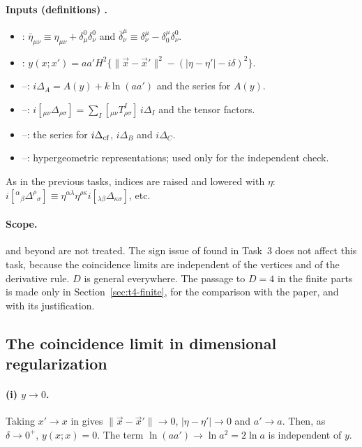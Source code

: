 \paragraph{Inputs (definitions) \tP.}
\begin{itemize}
\item {}: \(\bar\eta_{\mu\nu}\equiv\eta_{\mu\nu}+\delta^0_\mu\delta^0_\nu\) and
\(\bar\delta^\mu_\nu\equiv\delta^\mu_\nu-\delta^\mu_0\delta^0_\nu\).
\item {}: \(y(x;x')=aa'H^2\{\|\vec x-\vec x'\|^2-(|\eta-\eta'|-i\delta)^2\}\).
\item {}--: \(i\Delta_A=A(y)+k\ln(aa')\) and the series for \(A(y)\).
\item {}--: \(i[{}_{\mu\nu}\Delta_{\rho\sigma}]=\sum_I[{}_{\mu\nu}T^I_{\rho\sigma}]\,i\Delta_I\) and the
tensor factors.
\item {}--: the series for \(i\Delta_{\rm cf}\), \(i\Delta_B\) and \(i\Delta_C\).
\item {}--: hypergeometric representations; used only for the independent
check.
\end{itemize}
As in the previous tasks, indices are raised and lowered with \(\eta\):
\(i[{}^\alpha{}_\beta\Delta^\rho{}_\sigma]\equiv\eta^{\alpha\lambda}\eta^{\rho\kappa}i[{}_{\lambda\beta}\Delta_{\kappa\sigma}]\), etc.

\paragraph{Scope.}
 and beyond are not treated. The sign issue of  found in Task~3 does not
affect this task, because the coincidence limits are independent of the vertices and of
the derivative rule. \(D\) is general everywhere. The passage to \(D=4\) in the finite
parts is made only in Section~\ref{sec:t4-finite}, for the comparison with the paper,
and with its justification.

\subsection{The coincidence limit in dimensional regularization \texorpdfstring{\tA}{}}
\paragraph{(i) \(y\to0\).} Taking \(x'\to x\) in  gives \(\|\vec x-\vec x'\|\to0\),
\(|\eta-\eta'|\to0\) and \(a'\to a\). Then, as \(\delta\to0^+\), \(y(x;x)=0\). The term
\(\ln(aa')\to\ln a^2=2\ln a\) is independent of \(y\).

